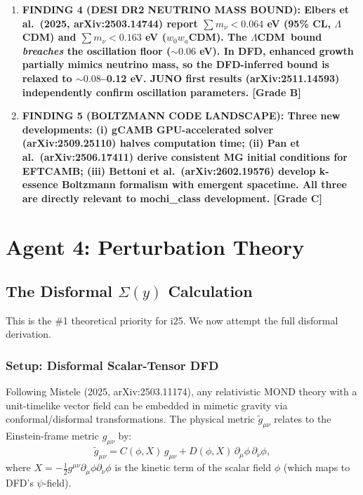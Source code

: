 \documentclass[11pt]{article}
\newcommand{\LCDM}{$\Lambda$CDM}
\begin{document}
\begin{tcolorbox}[colback=blue!5!white, colframe=blue!70!black,
  title=\textbf{W4i25 TOP 5 FINDINGS --- COSMOLOGY TEAM}]
\begin{enumerate}
\item \textbf{FINDING 4 (DESI DR2 NEUTRINO MASS BOUND):
  Elbers et al.\ (2025, arXiv:2503.14744) report
  $\sum m_\nu < 0.064$ eV (95\% CL, \LCDM) and
  $\sum m_\nu < 0.163$ eV ($w_0w_a$CDM). The \LCDM\ bound
  \emph{breaches} the oscillation floor ($\sim 0.06$ eV).
  In DFD, enhanced growth partially mimics neutrino mass,
  so the DFD-inferred bound is relaxed to $\sim 0.08$--0.12 eV.
  JUNO first results (arXiv:2511.14593) independently confirm
  oscillation parameters. [Grade B]}

\item \textbf{FINDING 5 (BOLTZMANN CODE LANDSCAPE):
  Three new developments: (i) gCAMB GPU-accelerated solver
  (arXiv:2509.25110) halves computation time; (ii) Pan et al.\
  (arXiv:2506.17411) derive consistent MG initial conditions
  for EFTCAMB; (iii) Bettoni et al.\ (arXiv:2602.19576) develop
  k-essence Boltzmann formalism with emergent spacetime.
  All three are directly relevant to mochi\_class development. [Grade C]}

\end{enumerate}
\end{tcolorbox}

\section{Agent 4: Perturbation Theory}

\subsection{The Disformal $\Sigma(y)$ Calculation}

This is the \#1 theoretical priority for i25. We now attempt the
full disformal derivation.

\subsubsection{Setup: Disformal Scalar-Tensor DFD}

Following Mistele (2025, arXiv:2503.11174), any relativistic MOND
theory with a unit-timelike vector field can be embedded in mimetic
gravity via conformal/disformal transformations. The physical metric
$\tilde{g}_{\mu\nu}$ relates to the Einstein-frame metric $g_{\mu\nu}$
by:
\begin{equation}
  \tilde{g}_{\mu\nu} = C(\phi,X)\,g_{\mu\nu} + D(\phi,X)\,\partial_\mu\phi\,\partial_\nu\phi,
  \label{eq:disformal}
\end{equation}
where $X = -\frac{1}{2}g^{\mu\nu}\partial_\mu\phi\partial_\nu\phi$
is the kinetic term of the scalar field $\phi$ (which maps to DFD's
$\psi$-field).
\end{document}
